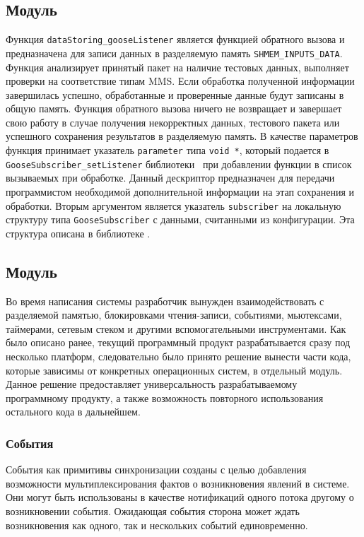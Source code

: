\subsection{Модуль \moduleDataStoring}

Функция \lstinline{dataStoring_gooseListener} является функцией обратного вызова и предназначена
для записи данных в разделяемую память \lstinline{SHMEM_INPUTS_DATA}. Функция анализирует принятый пакет на наличие
тестовых данных, выполняет проверки на соответствие типам MMS. Если
обработка полученной информации завершилась успешно, обработанные и проверенные данные будут записаны в общую память. Функция обратного вызова ничего не возвращает и завершает свою работу в случае получения некорректных данных, тестового пакета или успешного сохранения результатов в разделяемую память.
В качестве параметров функция принимает указатель \lstinline{parameter} типа
\lstinline{void *}, который подается в \lstinline{GooseSubscriber_setListener}
библиотеки \libIec\ при добавлении функции в список вызываемых при обработке.
Данный дескриптор предназначен для передачи программистом необходимой
дополнительной информации на этап сохранения и обработки.
Вторым аргументом является указатель \lstinline{subscriber} на локальную структуру
типа \lstinline{GooseSubscriber} с данными, считанными из конфигурации. Эта структура описана в библиотеке \libIec.

\subsection{Модуль \moduleOsal}

Во время написания системы разработчик вынужден взаимодействовать с разделяемой памятью, блокировками чтения-записи, событиями, мьютексами, таймерами, сетевым стеком и другими вспомогательными
инструментами. Как было описано ранее, текущий программный продукт разрабатывается сразу под несколько платформ, следовательно было принято решение вынести части кода,
которые зависимы от конкретных операционных систем, в отдельный модуль. Данное решение предоставляет универсальность разрабатываемому
программному продукту, а также возможность повторного использования остального
кода в дальнейшем.

\subsubsection{События}

События как примитивы синхронизации созданы с целью
добавления возможности мультиплексирования
фактов о возникновения явлений в системе.
Они могут быть использованы в качестве нотификаций одного потока другому
о возникновении события. Ожидающая события сторона может ждать возникновения
как одного, так и нескольких событий единовременно.

